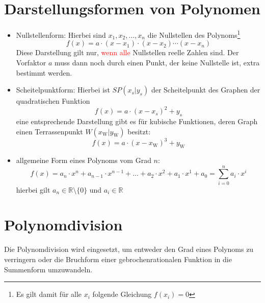 \section{Darstellungsformen von Polynomen}
\begin{itemize}
    \item Nullstellenform: Hierbei sind $x_1, x_2, \ldots, x_n$ die Nullstellen des Polynoms\footnote{Es gilt damit für alle $x_i$ folgende Gleichung $f(x_i) = 0$} $$f(x) = a\cdot (x-x_1)\cdot (x-x_2) \cdots (x-x_n)$$
    Diese Darstellung gilt nur, \textcolor{red}{wenn alle} Nullstellen reelle Zahlen sind. Der Vorfaktor $a$ muss dann noch durch einen Punkt, der keine Nullstelle ist, extra bestimmt werden.
    \item Scheitelpunktform: Hierbei ist $SP(x_s|y_s)$ der Scheitelpunkt des Graphen der quadratischen Funktion $$f(x) = a\cdot (x-x_s)^2 +y_s$$ eine entsprechende Darstellung gibt es für kubische Funktionen, deren Graph einen Terrassenpunkt $W(x_{\mathrm{W}}|y_{\mathrm{W}})$ besitzt: $$f(x) = a\cdot (x-x_{\mathrm{W}})^3 +y_{\mathrm{W}}$$ 
    \item allgemeine Form eines Polynoms vom Grad $n$: $$f(x) = a_n\cdot x^n + a_{n-1}\cdot x^{n-1} + \ldots + a_2\cdot x^2 + a_1\cdot x^1 + a_0 = \sum\limits_{i=0}^{n} a_i\cdot x^i$$ hierbei gilt $a_n \in \mathds{R}\setminus \{0\}$ und $a_i \in \mathds{R}$
\end{itemize}
\section{Polynomdivision}
Die Polynomdivision wird eingesetzt, um entweder den Grad eines Polynoms zu verringern oder die Bruchform einer gebrochenrationalen Funktion in die Summenform umzuwandeln. 
